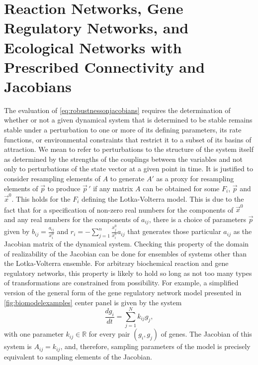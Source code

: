 

\section{Reaction Networks, Gene Regulatory Networks, and Ecological Networks with Prescribed Connectivity and Jacobians}\label{sec:reactionnetjacobian}

The evaluation of \ref{eq:robustnessonjacobians} requires the determination of whether or not a given dynamical system that is determined to be stable remains stable under a perturbation to one or more of its defining parameters, its rate functions, or environmental constraints that restrict it to a subset of its basins of attraction. We mean to refer to perturbations to the structure of the system itself as determined by the strengths of the couplings between the variables and not only to perturbations of the state vector at a given point in time. It is justified to consider resampling elements of $A$ to generate $A'$ as a proxy for resampling elements of $\vec{p}$ to produce $\vec{p}\,'$ if any matrix $A$ can be obtained for some $F_i$, $\vec{p}$ and $\vec{x}^0$. This holds for the $F_i$ defining the Lotka-Volterra model. This is due to the fact that for a specification of non-zero real numbers for the components of $\vec{x}^0$ and any real numbers for the components of $a_{ij}$, there is a choice of parameters $\vec{p}$ given by $b_{ij} = \frac{a_{ij}}{x_i^0}$ and $r_i = - \sum_{j=1}^n \frac{x_j^0}{x_i^0} a_{ij}$ that generates those particular $a_{ij}$ as the Jacobian matrix of the dynamical system. Checking this property of the domain of realizability of the Jacobian can be done for ensembles of systems other than the Lotka-Volterra ensemble. For arbitrary biochemical reaction and gene regulatory networks, this property is likely to hold so long as not too many types of transformations are constrained from possibility. For example, a simplified version of the general form of the gene regulatory network model presented in \ref{fig:biomodelexamples} center panel is given by the system
\begin{equation}
\frac{dg_i}{dt} = \sum_{j=1}^N k_{ij} g_j,
\end{equation}
with one parameter $k_{ij} \in \mathbb{R}$ for every pair $(g_i,g_j)$ of genes. The Jacobian of this system is $A_{ij} = k_{ij}$, and, therefore, sampling parameters of the model is precisely equivalent to sampling elements of the Jacobian.

